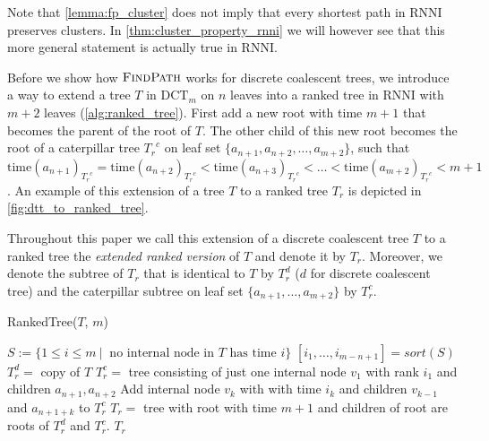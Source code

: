 \documentclass[11pt]{amsart}
\newcommand{\rnni}{\mathrm{RNNI}}
\newcommand{\findpath}{\textsc{FindPath}}
\newcommand{\ntime}{\mathrm{time}}
\newcommand{\dct}{\mathrm{DCT}}
\newcommand{\summary}[1]{} %
\begin{document}
Note that \autoref{lemma:fp_cluster} does not imply that every shortest path in $\rnni$ preserves clusters.
In \autoref{thm:cluster_property_rnni} we will however see that this more general statement is actually true in $\rnni$.

\summary{How to add leaves to a $\dct_m$ tree to transform it into a ranked tree}
Before we show how $\findpath$ works for discrete coalescent trees, we introduce a way to extend a tree $T$ in $\dct_m$ on $n$ leaves into a ranked tree in $\rnni$ with $m+2$ leaves (\autoref{alg:ranked_tree}).
First add a new root with time $m + 1$ that becomes the parent of the root of $T$.
The other child of this new root becomes the root of a caterpillar tree ${T_r}^c$ on leaf set $\{a_{n+1}, a_{n+2}, \ldots, a_{m+2}\}$, such that $\ntime(a_{n+1})_{{T_r}^c} = \ntime(a_{n+2})_{{T_r}^c} < \ntime(a_{n+3})_{{T_r}^c} < \ldots < \ntime(a_{m+2})_{{T_r}^c} < m+1$.
An example of this extension of a tree $T$ to a ranked tree $T_r$ is depicted in \autoref{fig:dtt_to_ranked_tree}.

Throughout this paper we call this extension of a discrete coalescent tree $T$ to a ranked tree the \emph{extended ranked version} of $T$ and denote it by $T_r$.
Moreover, we denote the subtree of $T_r$ that is identical to $T$ by $T_r^d$ ($d$ for discrete coalescent tree) and the caterpillar subtree on leaf set $\{a_{n+1}, \ldots, a_{m+2}\}$ by $T_r^c$.

\begin{algorithm}[ht]
	\caption{RankedTree($T$, $m$)}
	\label{alg:ranked_tree}
	\begin{algorithmic}[1]
		\STATE $S:= \{1 \leq i \leq m \ |\  \text{ no internal node in } T \text{ has time } i\}$
		\STATE $[i_1, \ldots, i_{m-n+1}] = sort(S)$
		\STATE $T_r^d =$ copy of $T$
		\STATE $T_r^c =$ tree consisting of just one internal node $v_1$ with rank $i_1$ and children $a_{n+1}, a_{n+2}$
			\STATE Add internal node $v_k$ with with time $i_k$ and children $v_{k-1}$ and $a_{n+1+k}$ to $T_r^c$
		\ENDFOR
		\STATE $T_r = $ tree with root with time $m+1$ and children of root are roots of $T_r^d$ and $T_r^c$.
		\RETURN $T_r$
	\end{algorithmic}
\end{algorithm}
\end{document}
